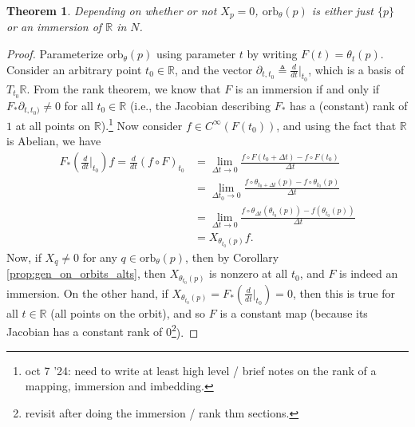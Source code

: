\documentclass[psamsfonts]{amsart}
\newtheorem{thm}{Theorem}[section]
\theoremstyle{definition}
\theoremstyle{remark}
\newcommand*\R{\mathds{R}}
\numberwithin{equation}{section}
\begin{document}
\begin{thm}
Depending on whether or not $X_p=0$, $\text{orb}_{\theta}(p)$ is either just $\{p\}$ or an immersion of $\R$ in $N$. 
\end{thm}
\begin{proof}
Parameterize $\text{orb}_{\theta}(p)$ using parameter $t$ by writing $F(t) = \theta_t(p)$. Consider an arbitrary point $t_0\in \R$, and the vector $\partial_{t, t_0}\triangleq \frac{d}{dt}\bigr|_{t_0}$, which is a basis of $T_{t_0}\R$. 
 From the rank theorem, we know that $F$ is an immersion if and only if $F_*\partial_{t, t_0)} \neq 0$ for all $t_0\in \R$ (i.e., the Jacobian describing $F_*$ has a (constant) rank of $1$ at all points on $\R$).\footnote{{\color{red}oct 7 '24: need to write at least high level / brief notes on the rank of a mapping, immersion and imbedding. }} Now consider $f\in C^{\infty}(F(t_0))$, and using the fact that $\R$ is Abelian, we have 
 \begin{equation}\begin{aligned}\label{eq:orbit_immersion}
F_*(\frac{d}{dt}\biggr|_{t_0})f = \frac{d}{dt}\left(f\circ F\right)_{t_0} &={} \lim_{\Delta t \rightarrow 0}\frac{f\circ F\left(t_0 + \Delta t\right)-f\circ F(t_0)}{\Delta t}\\
&={} \lim_{\Delta t_0 \rightarrow 0}\frac{f\circ \theta_{t_0+\Delta t}(p)-f\circ \theta_{t_0}(p)}{\Delta t}\\
&={} \lim_{\Delta t \rightarrow 0}\frac{f\circ \theta_{\Delta t}\left(\theta_{t_0}(p)\right)-f\left(\theta_{t_0}(p)\right)}{\Delta t}\\
&={} X_{\theta_{t_0}(p)}f. 
\end{aligned}\end{equation}
Now, if $X_q \neq 0$ for any $q\in \text{orb}_{\theta}(p)$, then by Corollary \ref{prop:gen_on_orbits_alts}, then $X_{\theta_{t_0}(p)}$ is nonzero at all $t_0$, and $F$ is indeed an immersion. On the other hand, if $X_{\theta_{t_0}(p)} = F_*(\frac{d}{dt}\bigr|_{t_0}) = 0$, then this is true for all $t\in \R$ (all points on the orbit), and so $F$ is a constant map ({\color{red}because its Jacobian has a constant rank of $0$\footnote{revisit after doing the immersion / rank thm sections.}}). 
\end{proof}
\end{document}
